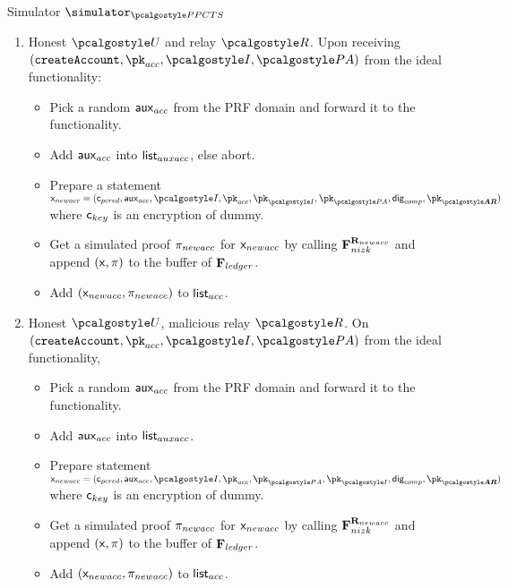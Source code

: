 \documentclass[runningheads,10pt]{llncs}
\numberwithin{equation}{section}
\begin{document}
\begin{simbox}{Simulator $\simulator_{\PPCTS}$}
\begin{enumerate}
  \item Honest $\user$ and relay $\relay$. Upon receiving $(\createAccount, \pk_{acc}, \idprov,
      \polas)$ from the ideal functionality:
    \begin{itemize}
    \item Pick a random $\mathsf{aux}_{acc}$ from
      the PRF domain and forward it to the functionality.
    \item Add $\mathsf{aux}_{acc}$ into ${\mathsf{list}_{auxacc}}$, else abort.
    \item Prepare a statement
      $\inp_{newacc} = (\cuser, \aux_{acc}, \idprov, \pk_{acc}, \pk_{\idprov}, \pk_{\polas},
      \policydig, \vec{\pk_{\ar}})$ where $\mathsf{c}_{key}$ is an encryption of
      dummy.
    \item Get a simulated proof $\mathsf{\pi}_{newacc}$ for $\mathsf{x}_{newacc}$ by calling $\mathbf{F}_{{nizk}}^{\mathbf{R}_{newacc}}$ and
      append $(\mathsf{x}, \mathsf{\pi})$ to the buffer of $\mathbf{F}_{{ledger}}$.
    \item Add $(\mathsf{x}_{newacc}, \mathsf{\pi}_{newacc})$ to ${\mathsf{list}_{acc}}$.
    \end{itemize}
    
  \item Honest $\user$, malicious relay $\relay$. On
    $(\createAccount, \pk_{acc}, \idprov, \polas)$ from the ideal functionality,
    \begin{itemize}
    \item Pick a random $\mathsf{aux}_{acc}$ from the PRF domain and forward it to
      the functionality.
    \item Add $\mathsf{aux}_{acc}$ into ${\mathsf{list}_{auxacc}}$.
    \item Prepare statement $\inp_{newacc} = (\cuser, \aux_{acc}, \idprov, \pk_{acc}, \pk_{\polas},
      \pk_{\idprov}, \policydig, \vec{\pk_{\ar}})$ where
      $\mathsf{c}_{key}$ is an encryption of dummy.
    \item Get a simulated proof $\mathsf{\pi}_{newacc}$ for $\mathsf{x}_{newacc}$ by calling
      $\mathbf{F}_{{nizk}}^{\mathbf{R}_{newacc}}$ and append $(\mathsf{x}, \mathsf{\pi})$ to the buffer of
      $\mathbf{F}_{{ledger}}$.
    \item Add $(\mathsf{x}_{newacc}, \mathsf{\pi}_{newacc})$ to ${\mathsf{list}_{acc}}$.
    \end{itemize}
    

\end{enumerate}
\end{simbox}
\end{document}
